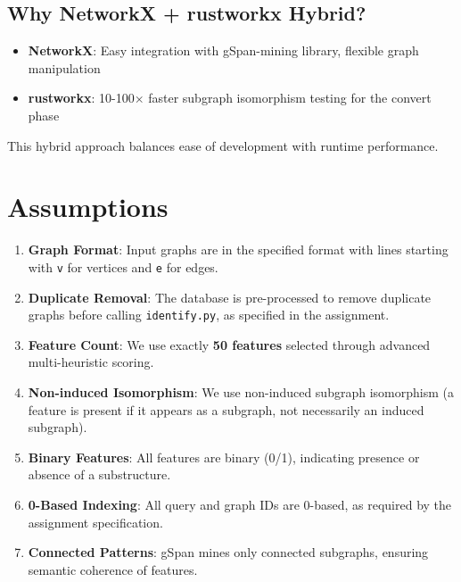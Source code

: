 \documentclass[12pt,a4paper]{article}
\begin{document}
\subsection{Why NetworkX + rustworkx Hybrid?}

\begin{itemize}
    \item \textbf{NetworkX}: Easy integration with gSpan-mining library, flexible graph manipulation
    \item \textbf{rustworkx}: 10-100$\times$ faster subgraph isomorphism testing for the convert phase
\end{itemize}

This hybrid approach balances ease of development with runtime performance.

\section{Assumptions}

\begin{enumerate}
    \item \textbf{Graph Format}: Input graphs are in the specified format with lines starting with \texttt{v} for vertices and \texttt{e} for edges.
    \item \textbf{Duplicate Removal}: The database is pre-processed to remove duplicate graphs before calling \texttt{identify.py}, as specified in the assignment.
    \item \textbf{Feature Count}: We use exactly \textbf{50 features} selected through advanced multi-heuristic scoring.
    \item \textbf{Non-induced Isomorphism}: We use non-induced subgraph isomorphism (a feature is present if it appears as a subgraph, not necessarily an induced subgraph).
    \item \textbf{Binary Features}: All features are binary (0/1), indicating presence or absence of a substructure.
    \item \textbf{0-Based Indexing}: All query and graph IDs are 0-based, as required by the assignment specification.
    \item \textbf{Connected Patterns}: gSpan mines only connected subgraphs, ensuring semantic coherence of features.
\end{enumerate}

\end{document}

